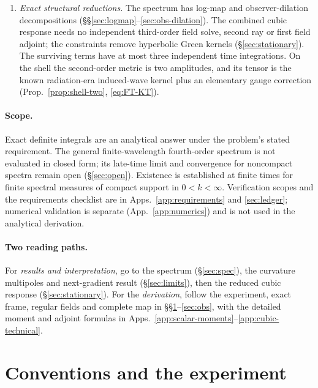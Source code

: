 \documentclass[11pt]{article}
\theoremstyle{definition}
\theoremstyle{remark}
\begin{document}
\begin{enumerate}
  Fermi--Walker frame and random-monopole normalisation (\S\ref{sec:obs}).
\item \emph{Exact structural reductions.} The spectrum has log-map and observer-dilation
  decompositions (\S\S\ref{sec:logmap}--\ref{sec:obs-dilation}). The combined cubic response
  needs no independent third-order field solve, second ray or first field adjoint;
  the constraints remove hyperbolic Green kernels (\S\ref{sec:stationary}). The surviving
  terms have at most three independent time integrations. On the shell the second-order
  metric is two amplitudes, and its tensor is the known radiation-era induced-wave kernel plus
  an elementary gauge correction (Prop.~\ref{prop:shell-two}, \eqref{eq:FT-KT}).
\end{enumerate}

\paragraph{Scope.}
Exact definite integrals are an analytical answer under the problem's stated requirement.
The general finite-wavelength fourth-order spectrum is not evaluated in closed form;
its late-time limit and convergence for noncompact spectra remain open (\S\ref{sec:open}).
Existence is established at finite times for finite spectral measures of compact support
in $0<k<\infty$. Verification scopes and the requirements checklist are in
Apps.~\ref{app:requirements} and \ref{sec:ledger}; numerical validation is separate
(App.~\ref{app:numerics}) and is not used in the analytical derivation.

\paragraph{Two reading paths.}
For \emph{results and interpretation}, go to the spectrum (\S\ref{sec:spec}), the curvature
multipoles and next-gradient result (\S\ref{sec:limits}), then the reduced cubic response
(\S\ref{sec:stationary}). For the \emph{derivation}, follow the experiment, exact frame,
regular fields and complete map in \S\S\ref{sec:conv}--\ref{sec:obs}, with the detailed
moment and adjoint formulas in Apps.~\ref{app:scalar-moments}--\ref{app:cubic-technical}.

\clearpage
\tableofcontents
\clearpage

\section{Conventions and the experiment}\label{sec:conv}
\end{document}
